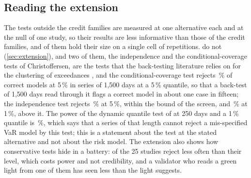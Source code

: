 \subsection{Reading the extension}
\label{sec:di-extension}

The \nExtTests{} tests outside the credit families are measured at one alternative each and at the null of one study, so their results are less informative than those of the credit families, and \nExtHold{} of them hold their size on a single cell of \nNullReps{} repetitions.
\nExtNotHold{} do not (\cref{sec:extension}), and two of them, the independence and the conditional-coverage tests of Christoffersen, are the tests that the back-testing literature relies on for the clustering of exceedances \citep{christoffersen1998}, and the conditional-coverage test rejects \chrCcFive\,\% of correct models at 5\,\% in series of 1,500 days at a 5\,\% quantile, so that a back-test of 1,500 days read through it flags a correct model in about one case in fifteen; the independence test rejects \chrIndFive\,\% at 5\,\%, within the bound of the screen, and \chrIndOne\,\% at 1\,\%, above it.
The power of the dynamic quantile test of \citet{engle2004} at 250 days and a 1\,\% quantile is \extPowMin\,\%, which says that a series of that length cannot reject a mis-specified VaR model by this test; this is a statement about the test at the stated alternative and not about the risk model. The extension also shows how conservative tests hide in a battery: \nExtCons{} of the 25 studies reject less often than their level, which costs power and not credibility, and a validator who reads a green light from one of them has seen less than the light suggests.
